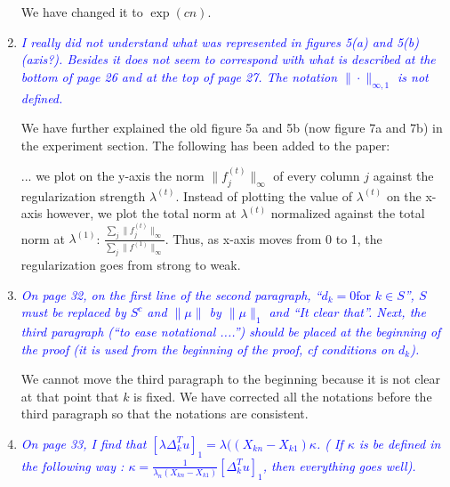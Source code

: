 \documentclass[pdftex,12pt]{article}
\def\rc#1{{\it\textcolor{blue}{#1}}\smallskip}
\begin{document}
\begin{enumerate}
We have changed it to $\exp(cn)$.


\item \rc{I really did not understand what was represented in figures 5(a) and
5(b) (axis?). Besides it does not seem to correspond with what is
described at the bottom of page 26 and at the top of page 27. The
notation $\|\cdot\|_{\infty,1}$ is not defined.}

We have further explained the old figure 5a and 5b (now figure 7a and 7b) in the experiment section. The following has been added to the paper:

... we plot on the y-axis the norm $\|f^{(t)}_j\|_{\infty}$ of every column $j$ against the regularization strength $\lambda^{(t)}$. Instead of plotting the value of $\lambda^{(t)}$ on the x-axis however, we plot the total norm at $\lambda^{(t)}$ normalized against the total norm at $\lambda^{(1)}$: $\frac{\sum_j \|f^{(t)}_j\|_{\infty}}{\sum_j \|f^{(1)}\|_{\infty}}$. Thus, as x-axis moves from 0 to 1, the regularization goes from strong to weak.


\item \rc{On page 32, on the first line of the second paragraph, ``$d_k = 0 \mbox{for $k
\in S$}$'', $S$ must be replaced by $S^c$ and $\|\mu\|$ by $\|\mu\|_1$ and ``It clear
that''. Next, the third paragraph (``to ease notational ....'') should
be placed at the beginning of the proof (it is used from the beginning
of the proof, cf conditions on $d_k$).}

We cannot move the third paragraph to the beginning because it is not clear at that point that $k$ is fixed. We have corrected all the notations before the third paragraph so that the notations are consistent.

\item \rc{On page 33, I find that $[\lambda\Delta_k^Tu]_1 = \lambda((X_{kn} −X_{k1})\kappa$. ( If $\kappa$ is be defined
in the following way : $\kappa = \frac{1}{\lambda_n(X_{kn}-X_{k1})}[\Delta_k^T u]_1$, then everything
goes well).}


\end{enumerate}
\end{document}
